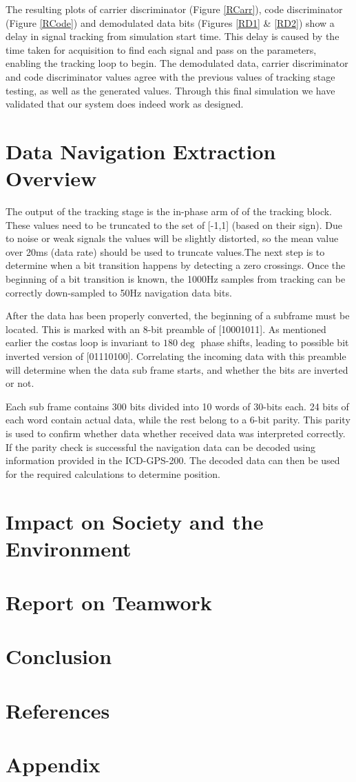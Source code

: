 \documentclass[11pt]{article}
\numberwithin{equation}{subsection}
\begin{document}
	
	The resulting plots of carrier discriminator (Figure \ref{RCarr}), code discriminator (Figure \ref{RCode}) and demodulated data bits (Figures \ref{RD1} \& \ref{RD2}) show a delay in signal tracking from simulation start time. This delay is caused by the time taken for acquisition to find each signal and pass on the parameters, enabling the tracking loop to begin. The demodulated data, carrier discriminator and code discriminator values agree with the previous values of tracking stage testing, as well as the generated values. Through this final simulation we have validated that our system does indeed work as designed.  
	
	\section{Data Navigation Extraction Overview}
	The output of the tracking stage is the in-phase arm of of the tracking block. These values need to be truncated to the set of [-1,1] (based on their sign). Due to noise or weak signals the values will be slightly distorted, so the mean value over 20ms (data rate) should be used to truncate values.The next step is to determine when a bit transition happens by detecting a zero crossings. Once the beginning of a bit transition is known, the 1000Hz samples from tracking can be correctly down-sampled to 50Hz navigation data bits.
	
	After the data has been properly converted, the beginning of a subframe must be located. This is marked with an 8-bit preamble of [10001011]. As mentioned earlier the costas loop is invariant to $180\deg$ phase shifts, leading to possible bit inverted version of [01110100]. Correlating the incoming data with this preamble will determine when the data sub frame starts, and whether the bits are inverted or not.
	
	Each sub frame contains 300 bits divided into 10 words of 30-bits each. 24 bits of each word contain actual data, while the rest belong to a 6-bit parity. This parity is used to confirm whether data whether received data was interpreted correctly. If the parity check is successful the navigation data can be decoded using information provided in the ICD-GPS-200. The decoded data can then be used for the required calculations to determine position.
	
	\section{Impact on Society and the Environment}
	\section{Report on Teamwork}
	
	\section{Conclusion}
	
	\section{References}
	
	\section{Appendix}	
	
	
	
\end{document}
